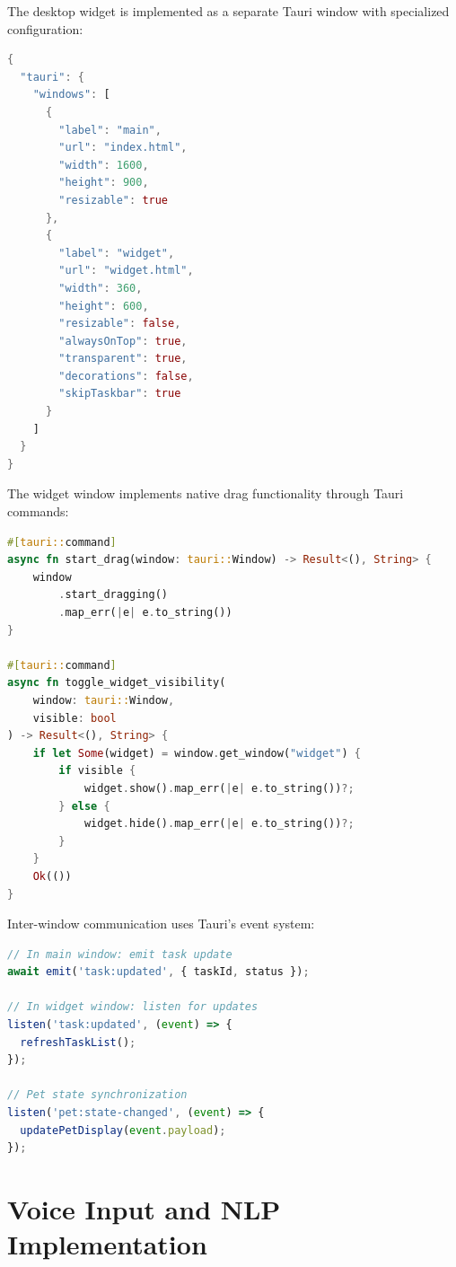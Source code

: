 \completed

The desktop widget is implemented as a separate Tauri window with specialized configuration:

\begin{lstlisting}[language=Rust, caption=Tauri Window Configuration (tauri.conf.json)]
{
  "tauri": {
    "windows": [
      {
        "label": "main",
        "url": "index.html",
        "width": 1600,
        "height": 900,
        "resizable": true
      },
      {
        "label": "widget",
        "url": "widget.html",
        "width": 360,
        "height": 600,
        "resizable": false,
        "alwaysOnTop": true,
        "transparent": true,
        "decorations": false,
        "skipTaskbar": true
      }
    ]
  }
}
\end{lstlisting}

The widget window implements native drag functionality through Tauri commands:

\begin{lstlisting}[language=Rust, caption=Window Drag Implementation (Rust)]
#[tauri::command]
async fn start_drag(window: tauri::Window) -> Result<(), String> {
    window
        .start_dragging()
        .map_err(|e| e.to_string())
}

#[tauri::command]
async fn toggle_widget_visibility(
    window: tauri::Window,
    visible: bool
) -> Result<(), String> {
    if let Some(widget) = window.get_window("widget") {
        if visible {
            widget.show().map_err(|e| e.to_string())?;
        } else {
            widget.hide().map_err(|e| e.to_string())?;
        }
    }
    Ok(())
}
\end{lstlisting}

Inter-window communication uses Tauri's event system:

\begin{lstlisting}[language=TypeScript, caption=Cross-Window Communication]
// In main window: emit task update
await emit('task:updated', { taskId, status });

// In widget window: listen for updates
listen('task:updated', (event) => {
  refreshTaskList();
});

// Pet state synchronization
listen('pet:state-changed', (event) => {
  updatePetDisplay(event.payload);
});
\end{lstlisting}

\section{Voice Input and NLP Implementation}
\label{sec:voice-implementation}

